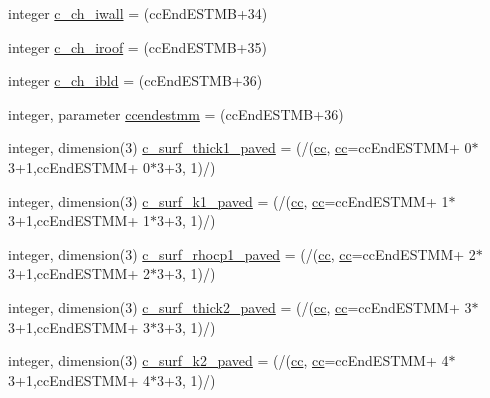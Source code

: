 \begin{DoxyCompactItemize}
\item 
integer \hyperlink{namespaceallocatearray_aba6715fe7d1cb112ef0eeb20541af378}{c\+\_\+ch\+\_\+iwall} = (cc\+End\+E\+S\+T\+MB+34)
\item 
integer \hyperlink{namespaceallocatearray_a695a45e540039b9484c1069b77d4068a}{c\+\_\+ch\+\_\+iroof} = (cc\+End\+E\+S\+T\+MB+35)
\item 
integer \hyperlink{namespaceallocatearray_ad5777b07403358943c3689a37f74bda7}{c\+\_\+ch\+\_\+ibld} = (cc\+End\+E\+S\+T\+MB+36)
\item 
integer, parameter \hyperlink{namespaceallocatearray_a97f946b42822d53377b7f67e337eac42}{ccendestmm} = (cc\+End\+E\+S\+T\+MB+36)
\item 
integer, dimension(3) \hyperlink{namespaceallocatearray_ab7f395250f896fcc5d16741a18d89d89}{c\+\_\+surf\+\_\+thick1\+\_\+paved} = (/(\hyperlink{namespaceallocatearray_ac863c81704eb507dee10f5e10741e10c}{cc}, \hyperlink{namespaceallocatearray_ac863c81704eb507dee10f5e10741e10c}{cc}=cc\+End\+E\+S\+T\+MM+ 0$\ast$3+1,cc\+End\+E\+S\+T\+MM+ 0$\ast$3+3, 1)/)
\item 
integer, dimension(3) \hyperlink{namespaceallocatearray_a70f82bab4ca451d3736e29ea97681c8e}{c\+\_\+surf\+\_\+k1\+\_\+paved} = (/(\hyperlink{namespaceallocatearray_ac863c81704eb507dee10f5e10741e10c}{cc}, \hyperlink{namespaceallocatearray_ac863c81704eb507dee10f5e10741e10c}{cc}=cc\+End\+E\+S\+T\+MM+ 1$\ast$3+1,cc\+End\+E\+S\+T\+MM+ 1$\ast$3+3, 1)/)
\item 
integer, dimension(3) \hyperlink{namespaceallocatearray_aad671adcddf83ad0ed699852d5d0a824}{c\+\_\+surf\+\_\+rhocp1\+\_\+paved} = (/(\hyperlink{namespaceallocatearray_ac863c81704eb507dee10f5e10741e10c}{cc}, \hyperlink{namespaceallocatearray_ac863c81704eb507dee10f5e10741e10c}{cc}=cc\+End\+E\+S\+T\+MM+ 2$\ast$3+1,cc\+End\+E\+S\+T\+MM+ 2$\ast$3+3, 1)/)
\item 
integer, dimension(3) \hyperlink{namespaceallocatearray_ac2c0390dbe3932c5ec8dfd22768a7e13}{c\+\_\+surf\+\_\+thick2\+\_\+paved} = (/(\hyperlink{namespaceallocatearray_ac863c81704eb507dee10f5e10741e10c}{cc}, \hyperlink{namespaceallocatearray_ac863c81704eb507dee10f5e10741e10c}{cc}=cc\+End\+E\+S\+T\+MM+ 3$\ast$3+1,cc\+End\+E\+S\+T\+MM+ 3$\ast$3+3, 1)/)
\item 
integer, dimension(3) \hyperlink{namespaceallocatearray_af9655c312046a7961c47c6ef2b8903b5}{c\+\_\+surf\+\_\+k2\+\_\+paved} = (/(\hyperlink{namespaceallocatearray_ac863c81704eb507dee10f5e10741e10c}{cc}, \hyperlink{namespaceallocatearray_ac863c81704eb507dee10f5e10741e10c}{cc}=cc\+End\+E\+S\+T\+MM+ 4$\ast$3+1,cc\+End\+E\+S\+T\+MM+ 4$\ast$3+3, 1)/)

\end{DoxyCompactItemize}

